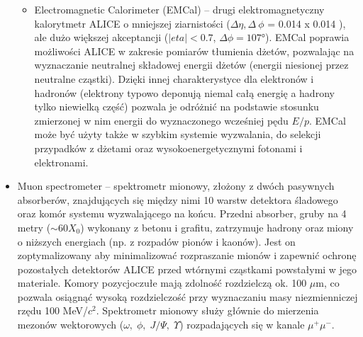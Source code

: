 \begin{itemize}
\begin{itemize}
		\item Electromagnetic Calorimeter (EMCal) -- drugi elektromagnetyczny kalorytmetr ALICE o mniejszej ziarnistości ($\Delta\eta,\Delta~\phi$ = 0.014 x 0.014 ), ale dużo większej akceptancji ($|eta| < 0.7$, $\Delta\phi = \ang{107}$).
EMCal poprawia możliwości ALICE w zakresie pomiarów tłumienia dżetów, pozwalając na wyznaczanie neutralnej składowej energii dżetów (energii niesionej przez neutralne cząstki). Dzięki innej charakterystyce dla elektronów i hadronów (elektrony typowo deponują niemal całą energię a hadrony tylko niewielką część) pozwala je odróżnić na podstawie stosunku zmierzonej w nim energii do wyznaczonego wcześniej pędu $E/p$.
EMCal może być użyty także w szybkim systemie wyzwalania, do selekcji przypadków z dżetami oraz wysokoenergetycznymi fotonami i elektronami.
	\end{itemize}
	\item Muon spectrometer -- spektrometr mionowy, złożony z dwóch pasywnych absorberów, znajdujących się między nimi 10 warstw detektora śladowego oraz komór systemu wyzwalającego na końcu. 
	Przedni absorber, gruby na 4 metry (${\sim}60 X_0$) wykonany z betonu i grafitu, zatrzymuje hadrony oraz miony o niższych energiach (np. z rozpadów pionów i kaonów). Jest on zoptymalizowany aby minimalizować rozpraszanie mionów i zapewnić ochronę pozostałych detektorów ALICE przed wtórnymi cząstkami powstałymi w jego materiale. 
Komory pozycjoczułe mają zdolność rozdzielczą ok. 100 $\mu$m, co pozwala osiągnąć wysoką rozdzielczość przy wyznaczaniu masy niezmienniczej rzędu 100 MeV/$c^2$.	Spektrometr mionowy służy głównie do mierzenia mezonów wektorowych ($\omega,\;\phi,\;J/\Psi,\;\Upsilon$) rozpadających się w kanale $\mu^+\mu^-$.
	

\end{itemize}

